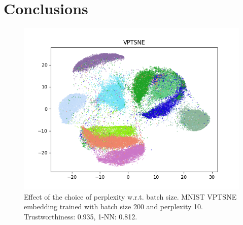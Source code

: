 \chapter{Conclusions}
\label{ch:conclusions}

\ifnameyear
  
\else
  
\fi


\appendix

\begin{figure}[!htb]
  \centering
  \includegraphics[width=\textwidth]{images/mnist_vptsne_bs_200_perp_10.png} 
  \caption{Effect of the choice of perplexity w.r.t. batch size. MNIST VPTSNE embedding trained with batch size 200 and perplexity 10. Trustworthiness: 0.935, 1-NN: 0.812.}
  \label{fig:low_perp_small_bs}
\end{figure}

